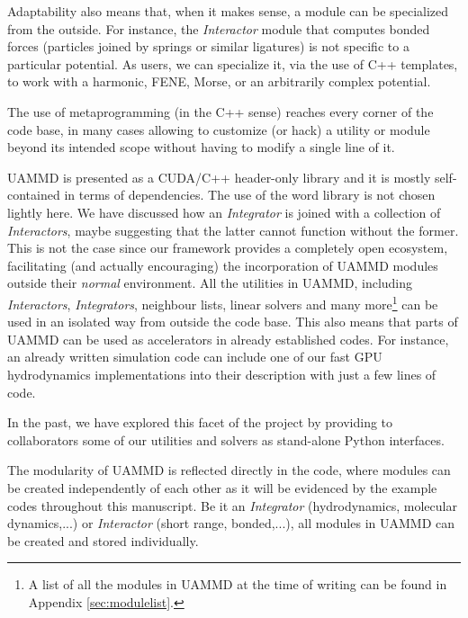 \documentclass[ twoside,openright,titlepage,numbers=noenddot,%
headinclude,footinclude,cleardoublepage=empty,abstract=on,
BCOR=5mm,paper=b5,fontsize=11pt, dvipsnames
]{scrreprt}
\newcommand{\uammd}{\gls{UAMMD}\xspace}
\newcommand{\gpu}{\gls{GPU}\xspace}
\begin{document}
Adaptability also means that, when it makes sense, a module can be specialized from the outside. For instance, the \emph{Interactor} module that computes bonded forces (particles joined by springs or similar ligatures) is not specific to a particular potential. As users, we can specialize it, via the use of C++ templates, to work with a harmonic, FENE\cite{Warner1972}, Morse\cite{Morse1929}, or an arbitrarily complex potential.

The use of metaprogramming (in the C++ sense) reaches every corner of the code base, in many cases allowing to customize (or hack) a utility or module beyond its intended scope without having to modify a single line of it.

\uammd is presented as a CUDA/C++ header-only library and it is mostly self-contained in terms of dependencies. The use of the word library is not chosen lightly here. We have discussed how an \emph{Integrator} is joined with a collection of \emph{Interactors}, maybe suggesting that the latter cannot function without the former. This is not the case since our framework provides a completely open ecosystem, facilitating (and actually encouraging) the incorporation of \uammd modules outside their \emph{normal} environment.
All the utilities in \uammd, including \emph{Interactors}, \emph{Integrators}, neighbour lists, linear solvers and many more\footnote{A list of all the modules in \uammd at the time of writing can be found in Appendix \ref{sec:modulelist}.} can be used in an isolated way from outside the code base. This also means that parts of \uammd can be used as accelerators in already established codes. For instance, an already written simulation code can include one of our fast \gpu hydrodynamics implementations into their description with just a few lines of code.

In the past, we have explored this facet of the project by providing to collaborators some of our utilities and solvers as stand-alone Python interfaces.

The modularity of \uammd is reflected directly in the code, where modules can be created independently of each other as it will be evidenced by the example codes throughout this manuscript.
Be it an \emph{Integrator} (hydrodynamics, molecular dynamics,...) or \emph{Interactor} (short range, bonded,...), all modules in \uammd can be created and stored individually.
\end{document}
